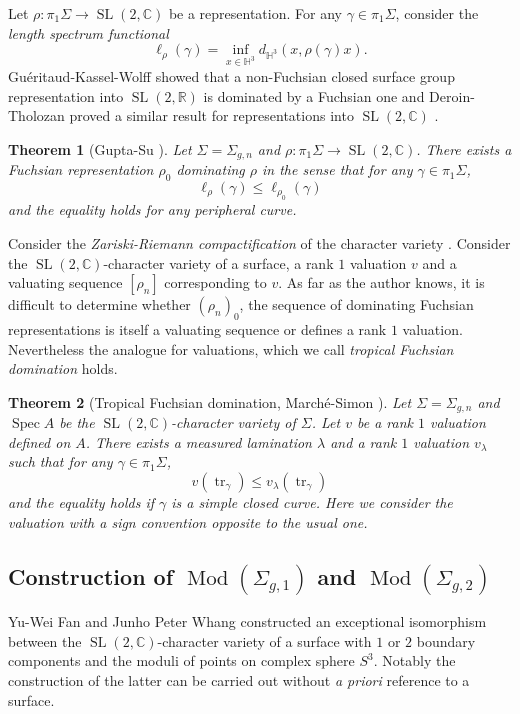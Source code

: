 \documentclass[11pt]{amsart}
\numberwithin{theorem}{section}
\newtheorem*{ntheorem}{Theorem}
\theoremstyle{definition}
\theoremstyle{remark}
\newcommand{\C}{{\mathbb{C}}}
\renewcommand{\H}{{\mathbb{H}}}
\newcommand{\R}{{\mathbb{R}}}
\DeclareMathOperator{\Mod}{Mod}
\DeclareMathOperator{\SL}{SL}
\DeclareMathOperator{\Spec}{Spec}
\DeclareMathOperator{\tr}{tr}
\newcommand{\<}{\langle}
\renewcommand{\>}{\rangle}
\begin{document}
Let $\rho : \pi_1 \Sigma \rightarrow \SL(2, \C)$ be a representation. For any $\gamma \in \pi_1 \Sigma$, consider the \textit{length spectrum functional}
\[
\ell_\rho(\gamma) = \inf_{x \in \H^3} d_{\H^3}(x, \rho(\gamma) x).
\]
Gu\'eritaud-Kassel-Wolff showed that a non-Fuchsian closed surface group representation into $\SL(2, \R)$ is dominated by a Fuchsian one and Deroin-Tholozan proved a similar result for representations into $\SL(2, \C)$ \cite{gueritaud2015compact, deroin2016dominating}.

\begin{ntheorem}[Gupta-Su \cite{gupta2023dominating}] Let $\Sigma = \Sigma_{g, n}$ and $\rho : \pi_1 \Sigma \rightarrow \SL(2, \C)$. There exists a Fuchsian representation $\rho_0$ dominating $\rho$ in the sense that for any $\gamma \in \pi_1 \Sigma$,
\[
\ell_\rho(\gamma) \leq \ell_{\rho_0}(\gamma)
\]
and the equality holds for any peripheral curve.
    
\end{ntheorem}

Consider the \textit{Zariski-Riemann compactification} of the character variety \cite{morgan1984valuations, otal2014compactification}. Consider the $\SL(2, \C)$-character variety of a surface, a rank $1$ valuation $v$ and a valuating sequence $[\rho_n]$ corresponding to $v$. As far as the author knows, it is difficult to determine whether $(\rho_n)_0$, the sequence of dominating Fuchsian representations is itself a valuating sequence or defines a rank $1$ valuation. Nevertheless the analogue for valuations, which we call \textit{tropical Fuchsian domination} holds.

\begin{ntheorem}[Tropical Fuchsian domination, March\'e-Simon \cite{marche2021automorphisms}]
    Let $\Sigma = \Sigma_{g, n}$ and $\Spec A$ be the $\SL(2, \C)$-character variety of $\Sigma$. Let $v$ be a rank $1$ valuation defined on $A$. There exists a measured lamination $\lambda$ and a rank $1$ valuation $v_\lambda$  such that for any $\gamma \in \pi_1 \Sigma$, 
    \[
    v(\tr_\gamma) \leq v_\lambda (\tr_\gamma)
    \]
    and the equality holds if $\gamma$ is a simple closed curve. Here we consider the valuation with a sign convention opposite to the usual one.
\end{ntheorem}

\subsection*{Construction of $\Mod(\Sigma_{g,1})$ and $\Mod(\Sigma_{g, 2})$} Yu-Wei Fan and Junho Peter Whang constructed an exceptional isomorphism between the $\SL(2, \C)$-character variety of a surface with $1$ or $2$ boundary components and the moduli of points on complex sphere $S^3$. Notably the construction of the latter can be carried out without \textit{a priori} reference to a surface.
\end{document}
